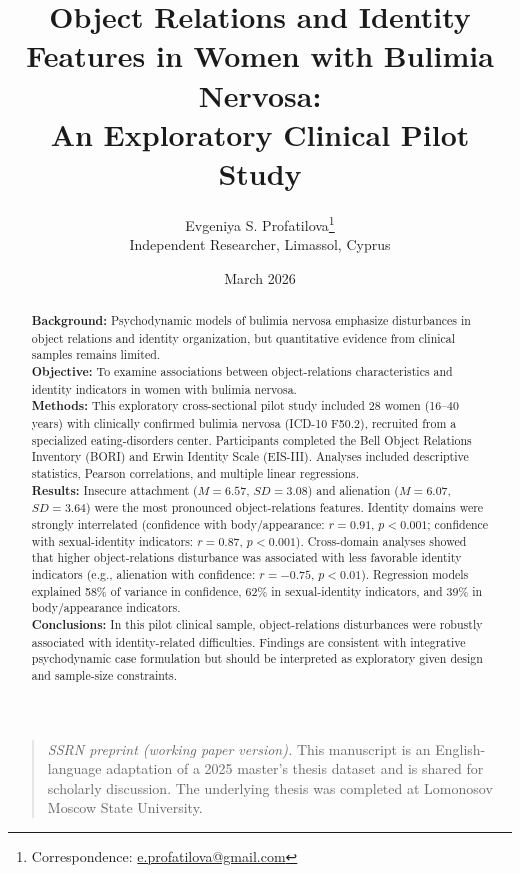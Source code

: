 \documentclass[12pt]{article}
\title{Object Relations and Identity Features in Women with Bulimia Nervosa:\\An Exploratory Clinical Pilot Study}
\author{Evgeniya S. Profatilova\thanks{Correspondence: \href{mailto:e.profatilova@gmail.com}{e.profatilova@gmail.com}}\\
Independent Researcher, Limassol, Cyprus}
\date{March 2026}
\begin{document}
\maketitle

\begin{quote}
\small
\noindent\textit{SSRN preprint (working paper version).} This manuscript is an English-language adaptation of a 2025 master's thesis dataset and is shared for scholarly discussion. The underlying thesis was completed at Lomonosov Moscow State University.
\normalsize
\end{quote}

\begin{abstract}
\noindent
\textbf{Background:} Psychodynamic models of bulimia nervosa emphasize disturbances in object relations and identity organization, but quantitative evidence from clinical samples remains limited. \\
\textbf{Objective:} To examine associations between object-relations characteristics and identity indicators in women with bulimia nervosa. \\
\textbf{Methods:} This exploratory cross-sectional pilot study included 28 women (16--40 years) with clinically confirmed bulimia nervosa (ICD-10 F50.2), recruited from a specialized eating-disorders center. Participants completed the Bell Object Relations Inventory (BORI) and Erwin Identity Scale (EIS-III). Analyses included descriptive statistics, Pearson correlations, and multiple linear regressions. \\
\textbf{Results:} Insecure attachment ($M=6.57$, $SD=3.08$) and alienation ($M=6.07$, $SD=3.64$) were the most pronounced object-relations features. Identity domains were strongly interrelated (confidence with body/appearance: $r=0.91$, $p<0.001$; confidence with sexual-identity indicators: $r=0.87$, $p<0.001$). Cross-domain analyses showed that higher object-relations disturbance was associated with less favorable identity indicators (e.g., alienation with confidence: $r=-0.75$, $p<0.01$). Regression models explained 58\% of variance in confidence, 62\% in sexual-identity indicators, and 39\% in body/appearance indicators. \\
\textbf{Conclusions:} In this pilot clinical sample, object-relations disturbances were robustly associated with identity-related difficulties. Findings are consistent with integrative psychodynamic case formulation but should be interpreted as exploratory given design and sample-size constraints.
\end{abstract}
\end{document}
